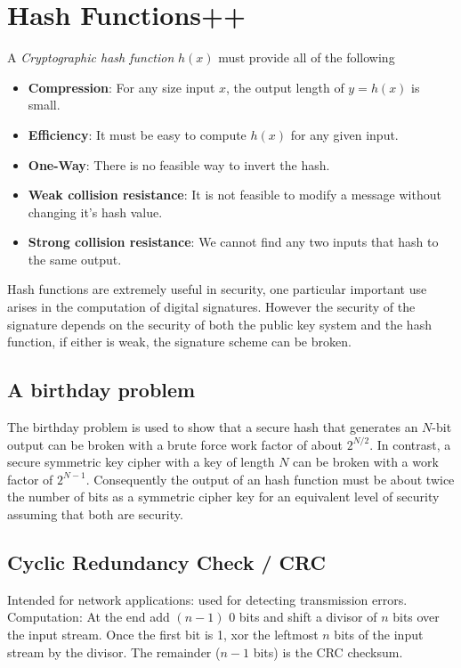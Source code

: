 \documentclass{article}
\begin{document}
\section{Hash Functions++}
A \textit{Cryptographic hash function} $h(x)$ must provide all of the following
\begin{itemize}
    \item \textbf{Compression}: For any size input $x$, the output length of $y = h(x)$ is small.
    \item \textbf{Efficiency}: It must be easy to compute $h(x)$ for any given input.
    \item \textbf{One-Way}: There is no feasible way to invert the hash.
    \item \textbf{Weak collision resistance}: It is not feasible to modify a message without changing it's hash value.
    \item \textbf{Strong collision resistance}: We cannot find any two inputs that hash to the same output.
\end{itemize}
Hash functions are extremely useful in security, one particular important use arises in the computation of digital signatures. However the security of the signature depends on the security of both the public key system and the hash function, if either is weak, the signature scheme can be broken.

\subsection{A birthday problem}
The birthday problem is used to show that a secure hash that generates an $N$-bit output can be broken with a brute force work factor of about $2^{N/2}$. In contrast, a secure symmetric key cipher with a key of length $N$ can be broken with a work factor of $2^{N-1}$. Consequently the output of an hash function must be about twice the number of bits as a symmetric cipher key for an equivalent level of security assuming that both are security.

\subsection{Cyclic Redundancy Check / CRC}
Intended for network applications: used for detecting transmission errors.\\
Computation: At the end add $(n-1)$ 0 bits and shift a divisor of $n$ bits over the input stream. Once the first bit is 1, xor the leftmost $n$ bits of the input stream by the divisor. The remainder ($n-1$ bits) is the CRC checksum.
\end{document}
